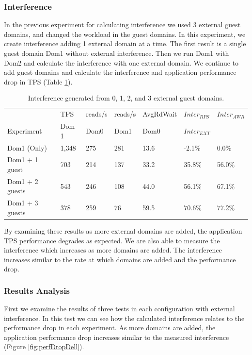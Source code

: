 \subsubsection{Interference}
In the previous experiment for calculating interference we used 3 external guest domains, and changed the workload in the guest domains.  In this experiment, we create interference adding 1 external domain at a time.  The first result is a single guest domain Dom1 without external interference.  Then we run Dom1 with Dom2 and calculate the interference with one external domain.  We continue to add guest domains and calculate the interference and application performance drop in TPS (Table \ref{tab:domains}).

\begin{table}[!h]
\begin{tabular}{ l l l l l l p{2cm} }
                   & TPS   & reads/s & reads/s & AvgRdWait & $Inter_{RPS}$ & $Inter_{AWR}$ \\
	Experiment     & Dom 1 & Dom0     & Dom1     & Dom0      & $Inter_{EXT}$ &             \\
	\hline
    Dom1 (Only)     &1,348 & 275      & 281      & 13.6     &  -2.1\%  &   0.0\%   \\
    Dom1 + 1 guest  &  703 & 214      & 137      & 33.2     &  35.8\%  &   56.0\%  \\
    Dom1 + 2 guests &  543 & 246      & 108      & 44.0     &  56.1\%  &   67.1\%    \\
    Dom1 + 3 guests &  378 & 259      &  76      & 59.5     &  70.6\%  &   77.2\%  \\
\end{tabular}
\caption{Interference generated from 0, 1, 2, and 3 external guest domains.}
\label{tab:domains}
\end{table}

By examining these results as more external domains are added, the application TPS performance degrades as expected.  We are also able to measure the interference which increases as more domains are added.  The interference increases similar to the rate at which domains are added and the performance drop.

\subsubsection{Results Analysis}
First we examine the results of three tests in each configuration with external interference.  In this test we can see how the calculated interference relates to the performance drop in each experiment.  As more domains are added, the application performance drop increases similar to the measured interference (Figure \ref{fig:perfDropDell}).

